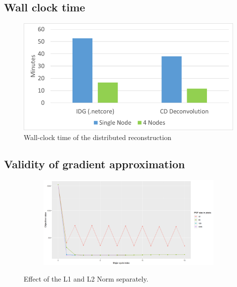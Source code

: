 \subsection{Wall clock time}
\begin{figure}[h]
	\centering
	\includegraphics[width=0.80\linewidth]{./chapters/10.results/wall-clock-time.png}
	\caption{Wall-clock time of the distributed reconstruction}
	\label{results:time:fig}
\end{figure}


\subsection{Validity of gradient approximation} \label{results:gradients}

\begin{figure}[h]
	\centering
	\begin{subfigure}[b]{1.0\linewidth}
		\includegraphics[width=\linewidth]{./chapters/10.results/gradient/size.png}
	\end{subfigure}
	
	\caption{Effect of the L1 and L2 Norm separately.}
	\label{results:gradients:size}
\end{figure}

